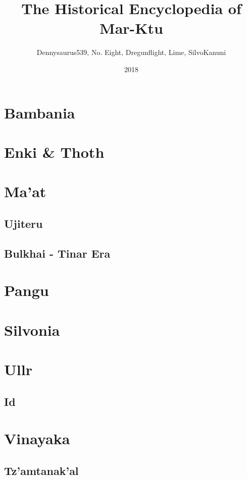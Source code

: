 \documentclass[ansiapaper, 11pt, openright, twoside]{book}
\title{The Historical Encyclopedia of Mar-Ktu}
\date{2018}
\author{Dennysaurus539, No. Eight, Dregunflight, Lime, SilvoKanuni}
\begin{document}
	
	
	\chapter{Bambania}
		\begin{multicols}{2}
			
		\end{multicols}
	\chapter{Enki \& Thoth}
		\begin{multicols}{2}
			
		\end{multicols}
	\chapter{Ma'at}
		\begin{multicols}{2}
			\section{Ujiteru}
				
			\section{Bulkhai - Tinar Era}
				
		\end{multicols}
	\chapter{Pangu}
		\begin{multicols}{2}
			
		\end{multicols}
	\chapter{Silvonia}
		\begin{multicols}{2}
			
		\end{multicols}
	\chapter{Ullr}
		\begin{multicols}{2}
			\section{Id}
				
		\end{multicols}
	\chapter{Vinayaka} 
		\begin{multicols}{2}
			\section{Tz'amtanak'al}
				
		\end{multicols}
	\printindex
	
\end{document}
